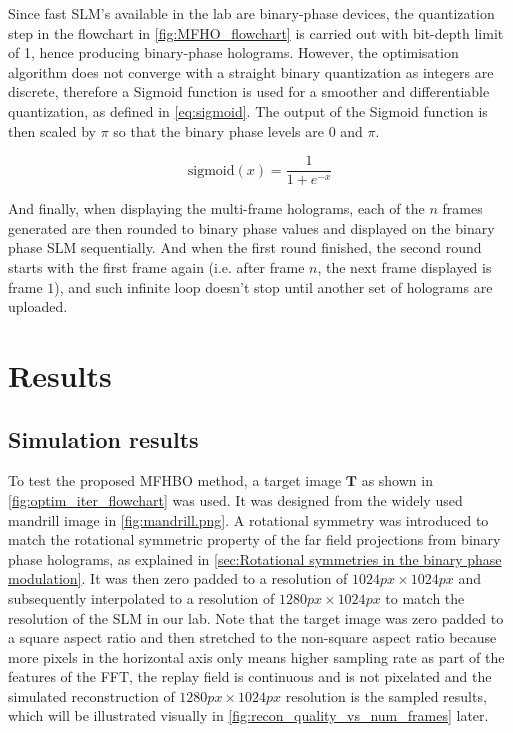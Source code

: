 
	Since fast SLM's available in the lab are binary-phase devices, the quantization step in the flowchart in \cref{fig:MFHO_flowchart} is carried out with bit-depth limit of 1, hence producing binary-phase holograms. However, the optimisation algorithm does not converge with a straight binary quantization as integers are discrete, therefore a Sigmoid function \cite{Bacaer2011} is used for a smoother and differentiable quantization, as defined in \cref{eq:sigmoid}. The output of the Sigmoid function is then scaled by $\pi$ so that the binary phase levels are $0$ and $\pi$.

	\begin{equation}
		\mathrm{sigmoid}(x)=\frac{1}{1+e^{-x}}
		\label{eq:sigmoid}
	\end{equation}

	And finally, when displaying the multi-frame holograms, each of the $n$ frames generated are then rounded to binary phase values and displayed on the binary phase SLM sequentially. And when the first round finished, the second round starts with the first frame again (i.e. after frame $n$, the next frame displayed is frame $1$), and such infinite loop doesn't stop until another set of holograms are uploaded.

\section{Results}

\subsection{Simulation results}
	To test the proposed MFHBO method, a target image $\textbf{T}$ as shown in \cref{fig:optim_iter_flowchart} was used. It was designed from the widely used mandrill image \cite{MANDRILL_REF} in \cref{fig:mandrill.png}. A rotational symmetry was introduced to match the rotational symmetric property of the far field projections from binary phase holograms, as explained in \cref{sec:Rotational symmetries in the binary phase modulation}. It was then zero padded to a resolution of $1024px\times 1024px$ and subsequently interpolated to a resolution of $1280px\times 1024px$ to match the resolution of the SLM in our lab. Note that the target image was zero padded to a square aspect ratio and then stretched to the non-square aspect ratio because more pixels in the horizontal axis only means higher sampling rate as part of the features of the FFT, the replay field is continuous and is not pixelated and the simulated reconstruction of $1280px\times 1024px$ resolution is the sampled results, which will be illustrated visually in \cref{fig:recon_quality_vs_num_frames} later.

